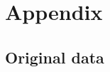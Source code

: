 \section{Appendix}
\label{sec:Appendix}
\subsection{Original data}
\centering

\begin{figure}
    \centering
    
\end{figure}

